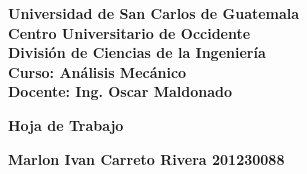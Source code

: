 \documentclass[12pt,letterpaper]{article}
\begin{document}
	
	\thispagestyle{empty}
	
	\begin{flushleft}
		\Large %
		\textbf{Universidad de San Carlos de Guatemala}\\
		\textbf{Centro Universitario de Occidente}\\
		\textbf{División de Ciencias de la Ingeniería}\\
		\textbf{Curso: Análisis Mecánico}\\
		\textbf{Docente: Ing. Oscar Maldonado}\\
		
		
	\end{flushleft}
	
	\vspace*{5cm} 
	
	\begin{center}
		\Huge %
		\textbf{ Hoja de Trabajo}
	\end{center}
	
	\vfill 
	
	\begin{flushright}
		\Large %
		\textbf{ Marlon Ivan Carreto Rivera 201230088}
	\end{flushright}
	
	\vspace{1cm}
	
\end{document}
